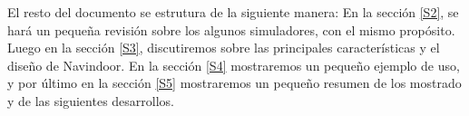 
El resto del documento se estrutura de la siguiente manera: En la sección \ref{S2}, se hará un pequeña revisión sobre los algunos simuladores, con el mismo propósito. Luego en la  sección \ref{S3}, discutiremos sobre las principales características y el diseño de Navindoor. En la sección \ref{S4} mostraremos un pequeño ejemplo de uso, y por último en la sección \ref{S5} mostraremos un pequeño resumen de los mostrado y de las siguientes desarrollos.






